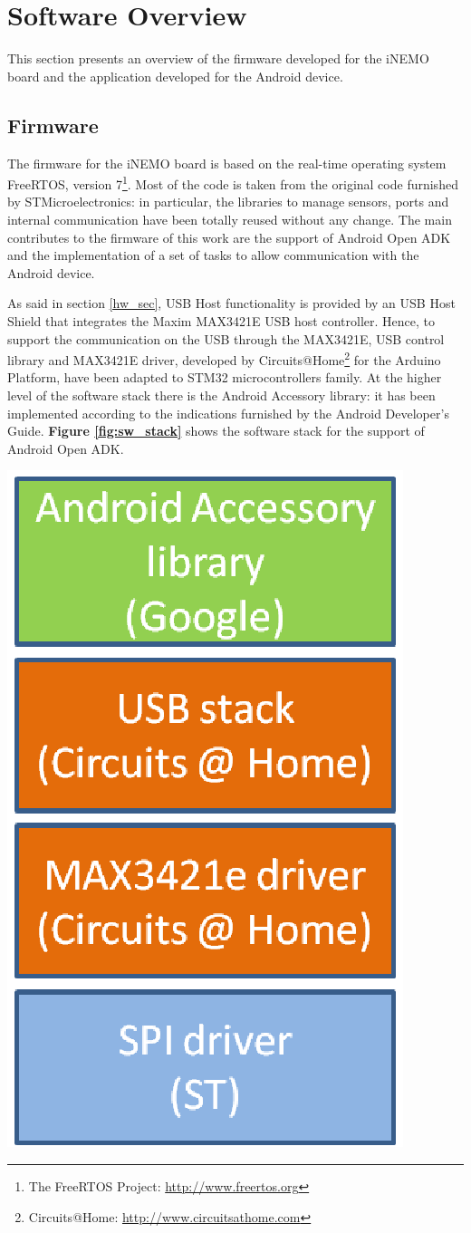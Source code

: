 \section{Software Overview}
\label{sw_sec}

This section presents an overview of the firmware developed for the iNEMO board and the application developed for the Android device.

\subsection{Firmware}
\label{fw_sec}

The firmware for the iNEMO board is based on the real-time operating system FreeRTOS, version 7\footnote{The FreeRTOS Project: \url{http://www.freertos.org}}. Most of the code is taken from the original code furnished by STMicroelectronics: in particular, the libraries to manage sensors, ports and internal communication have been totally reused without any change. The main contributes to the firmware of this work are the support of Android Open ADK and the implementation of a set of tasks to allow communication with the Android device.

As said in section \ref{hw_sec}, USB Host functionality is provided by an USB Host Shield that integrates the Maxim MAX3421E USB host controller. Hence, to support the communication on the USB through the MAX3421E, USB control library and MAX3421E driver, developed by Circuits@Home\footnote{Circuits@Home: \url{http://www.circuitsathome.com}} for the Arduino Platform, have been adapted to STM32 microcontrollers family. At the higher level of the software stack there is the Android Accessory library: it has been implemented according to the indications furnished by the Android Developer's Guide. {\bf Figure \ref{fig:sw_stack}} shows the software stack for the support of Android Open ADK. 

\begin{center}
	\includegraphics[width=0.5\linewidth]{pics/sw_stack.eps}
	\label{fig:sw_stack}
\end{center}

